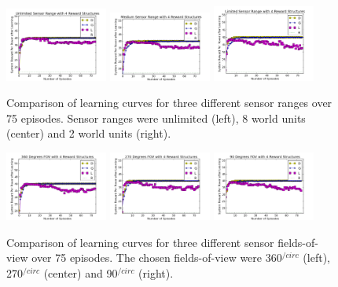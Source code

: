 \documentclass[letterpaper, 10 pt, conference]{ieeeconf}  %
\begin{document}
\begin{figure}
    \centering
    \includegraphics[width=0.3\textwidth]{SR_U.png}
    \includegraphics[width=0.3\textwidth]{SR_M.png}
    \includegraphics[width=0.3\textwidth]{SR_L.png}
    \caption{Comparison of learning curves for three different sensor ranges over 75 episodes. Sensor ranges were unlimited (left), 8 world units (center) and 2 world units (right). }
    \label{fig:sensor-range}
\end{figure}

\begin{figure}
    \centering
    \includegraphics[width=0.3\textwidth]{SF_360.png}
    \includegraphics[width=0.3\textwidth]{SF_270.png}
    \includegraphics[width=0.3\textwidth]{SF_90.png}
    \caption{Comparison of learning curves for three different sensor fields-of-view over 75 episodes. The chosen fields-of-view were 360$^{/circ}$ (left), 270$^{/circ}$ (center) and 90$^{/circ}$ (right). }
    \label{fig:sensor-fov}
\end{figure}
\end{document}

